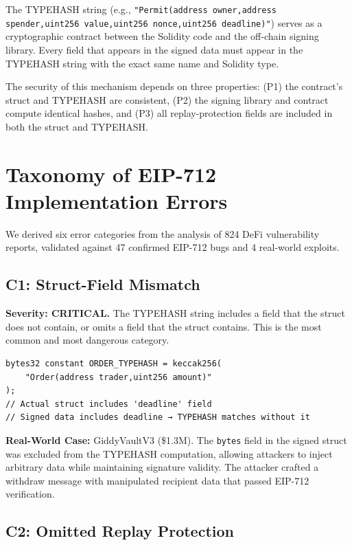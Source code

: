 \documentclass[runningheads]{llncs}
\begin{document}
The TYPEHASH string (e.g., \texttt{"Permit(address owner,address spender,uint256 value,uint256 nonce,uint256 deadline)"}) serves as a cryptographic contract between the Solidity code and the off-chain signing library. Every field that appears in the signed data must appear in the TYPEHASH string with the exact same name and Solidity type.

The security of this mechanism depends on three properties: (P1) the contract's struct and TYPEHASH are consistent, (P2) the signing library and contract compute identical hashes, and (P3) all replay-protection fields are included in both the struct and TYPEHASH.

\section{Taxonomy of EIP-712 Implementation Errors}

We derived six error categories from the analysis of 824 DeFi vulnerability reports, validated against 47 confirmed EIP-712 bugs and 4 real-world exploits.

\subsection{C1: Struct-Field Mismatch}

\textbf{Severity: CRITICAL.} The TYPEHASH string includes a field that the struct does not contain, or omits a field that the struct contains. This is the most common and most dangerous category.

\begin{lstlisting}[caption={VULNERABLE: TYPEHASH excludes critical struct field}]
bytes32 constant ORDER_TYPEHASH = keccak256(
    "Order(address trader,uint256 amount)"
);
// Actual struct includes 'deadline' field
// Signed data includes deadline → TYPEHASH matches without it
\end{lstlisting}

\textbf{Real-World Case:} GiddyVaultV3 (\$1.3M). The \texttt{bytes} field in the signed struct was excluded from the TYPEHASH computation, allowing attackers to inject arbitrary data while maintaining signature validity. The attacker crafted a withdraw message with manipulated recipient data that passed EIP-712 verification.

\subsection{C2: Omitted Replay Protection}
\end{document}
